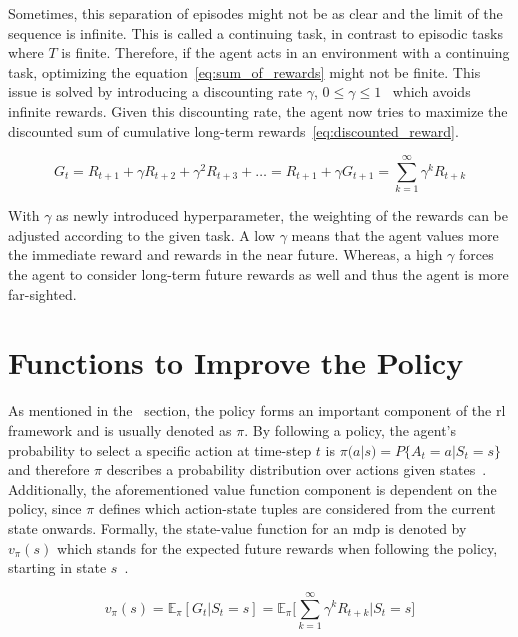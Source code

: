 \documentclass[draft,final]{vutinfth} %
\begin{document}
    Sometimes, this separation of episodes might not be as clear and the limit of the sequence is infinite.
    This is called a continuing task, in contrast to episodic tasks where $T$ is finite.
    Therefore, if the agent acts in an environment with a continuing task, optimizing the equation~\eqref{eq:sum_of_rewards} might not be finite.
    This issue is solved by introducing a discounting rate $\gamma$, $0 \leq \gamma \leq 1$~\citep{sutton_reinforcement_2018} which avoids infinite rewards.
    Given this discounting rate, the agent now tries to maximize the discounted sum of cumulative long-term rewards~\eqref{eq:discounted_reward}.

    \begin{equation}
        G_t = R_{t+1} + \gamma R_{t+2}+ \gamma^2 R_{t+3} + \ldots = R_{t+1} + \gamma G_{t+1} = \sum_{k=1}^{\infty} \gamma^k R_{t+k}\label{eq:discounted_reward}
    \end{equation}

    With $\gamma$ as newly introduced hyperparameter, the weighting of the rewards can be adjusted according to the given task.
    A low $\gamma$ means that the agent values more the immediate reward and rewards in the near future.
    Whereas, a high $\gamma$ forces the agent to consider long-term future rewards as well and thus the agent is more far-sighted.


    \section{Functions to Improve the Policy}\label{sec:functions-to-improve-the-policy}
    As mentioned in the~ section, the policy forms an important component of the \gls{rl} framework and is usually denoted as $\pi$.
    By following a policy, the agent's probability to select a specific action at time-step $t$ is $\pi(a|s) = P\{A_t=a|S_t=s\}$ and therefore $\pi$ describes a probability distribution over actions given states~\citep{silver_lecture_2015-1}.
    Additionally, the aforementioned value function component is dependent on the policy, since $\pi$ defines which action-state tuples are considered from the current state onwards.
    Formally, the state-value function for an \gls{mdp} is denoted by $v_\pi(s)$ which stands for the expected future rewards when following the policy, starting in state $s$~\citep{sutton_reinforcement_2018}.

    \begin{equation}
        v_\pi(s) = \mathbb{E}_\pi[G_t|S_t = s] = \mathbb{E}_\pi \Bigg[\sum_{k=1}^{\infty} \gamma^k R_{t+k} \bigg| S_t = s \Bigg]\label{eq:value_function}
    \end{equation}
\end{document}
